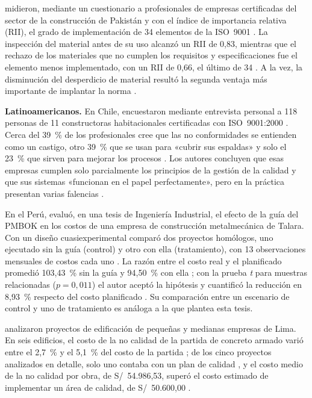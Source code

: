 \textcite{shaikh2020} midieron, mediante un cuestionario a profesionales de empresas certificadas del sector de la construcción de Pakistán y con el índice de importancia relativa (RII), el grado de implementación de 34 elementos de la ISO~9001 \parencite[p.~1138]{shaikh2020}. La inspección del material antes de su uso alcanzó un RII de 0,83, mientras que el rechazo de los materiales que no cumplen los requisitos y especificaciones fue el elemento menos implementado, con un RII de 0,66, el último de 34 \parencite[p.~1139]{shaikh2020}. A la vez, la disminución del desperdicio de material resultó la segunda ventaja más importante de implantar la norma \parencite[p.~1140]{shaikh2020}.

\textbf{Latinoamericanos.} En Chile, \textcite{romero2007} encuestaron mediante entrevista personal a 118 personas de 11 constructoras habitacionales certificadas con ISO~9001:2000 \parencite[p.~197]{romero2007}. Cerca del 39~\% de los profesionales cree que las no conformidades se entienden como un castigo, otro 39~\% que se usan para «cubrir sus espaldas» y solo el 23~\% que sirven para mejorar los procesos \parencite[p.~202]{romero2007}. Los autores concluyen que esas empresas cumplen solo parcialmente los principios de la gestión de la calidad y que sus sistemas «funcionan en el papel perfectamente», pero en la práctica presentan varias falencias \parencite[pp.~208--209]{romero2007}.

En el Perú, \textcite{salazar2018} evaluó, en una tesis de Ingeniería Industrial, el efecto de la guía del PMBOK en los costos de una empresa de construcción metalmecánica de Talara. Con un diseño cuasiexperimental comparó dos proyectos homólogos, uno ejecutado sin la guía (control) y otro con ella (tratamiento), con 13 observaciones mensuales de costos cada uno \parencite[p.~22]{salazar2018}. La razón entre el costo real y el planificado promedió 103,43~\% sin la guía y 94,50~\% con ella \parencite[p.~40]{salazar2018}; con la prueba \emph{t} para muestras relacionadas ($p = 0{,}011$) el autor aceptó la hipótesis y cuantificó la reducción en 8,93~\% respecto del costo planificado \parencite[p.~41]{salazar2018}. Su comparación entre un escenario de control y uno de tratamiento es análoga a la que plantea esta tesis.

\textcite{gudiel2020} analizaron proyectos de edificación de pequeñas y medianas empresas de Lima. En seis edificios, el costo de la no calidad de la partida de concreto armado varió entre el 2,7~\% y el 5,1~\% del costo de la partida \parencite[p.~1]{gudiel2020}; de los cinco proyectos analizados en detalle, solo uno contaba con un plan de calidad \parencite[p.~80]{gudiel2020}, y el costo medio de la no calidad por obra, de S/~54.986,53, superó el costo estimado de implementar un área de calidad, de S/~50.600,00 \parencite[p.~95]{gudiel2020}.

